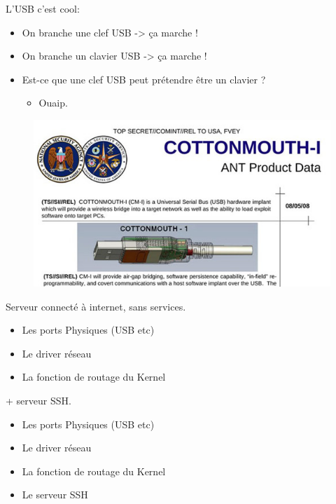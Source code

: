 \begin{frame}

L'USB c'est cool:
\begin{itemize}
    \item On branche une clef USB -> ça marche !
    \item On branche un clavier USB -> ça marche !
    \item Est-ce que une clef USB peut prétendre être un clavier ?
    \begin{itemize}
        \item Ouaip.
    \end{itemize}
\end{itemize}

\begin{figure}
\includegraphics[scale=0.55]{res/badusb}
\end{figure}


\end{frame}


\begin{frame}
\begin{center}
Serveur connecté à internet, sans services.

\begin{itemize}
    \item Les ports Physiques (USB etc)
    \item Le driver réseau
    \item La fonction de routage du Kernel
\end{itemize}

+ serveur SSH.

\begin{itemize}
    \item Les ports Physiques (USB etc)
    \item Le driver réseau
    \item La fonction de routage du Kernel
    \item Le serveur SSH
\end{itemize}
\end{center}

\end{frame}



